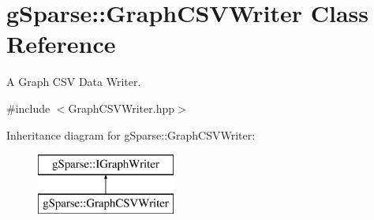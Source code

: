 \hypertarget{classg_sparse_1_1_graph_c_s_v_writer}{}\section{g\+Sparse\+:\+:Graph\+C\+S\+V\+Writer Class Reference}
\label{classg_sparse_1_1_graph_c_s_v_writer}


A Graph C\+SV Data Writer.  




{\ttfamily \#include $<$Graph\+C\+S\+V\+Writer.\+hpp$>$}

Inheritance diagram for g\+Sparse\+:\+:Graph\+C\+S\+V\+Writer\+:\begin{figure}[H]
\begin{center}
\leavevmode
\includegraphics[height=2.000000cm]{classg_sparse_1_1_graph_c_s_v_writer}
\end{center}
\end{figure}
